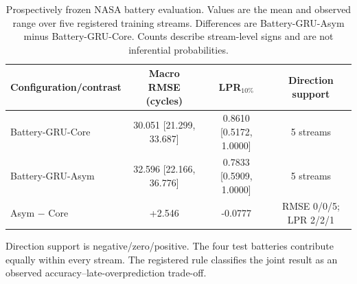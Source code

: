\begin{table}[H]
\centering
\small
\caption{Prospectively frozen NASA battery evaluation. Values are the mean and observed range over five registered training streams. Differences are Battery-GRU-Asym minus Battery-GRU-Core. Counts describe stream-level signs and are not inferential probabilities.}
\label{tab:battery-primary}
\begin{tabular}{@{}lccc@{}}
\toprule
Configuration/contrast & Macro RMSE (cycles) & LPR$_{10\%}$ & Direction support \\
\midrule
Battery-GRU-Core & 30.051 [21.299, 33.687] & 0.8610 [0.5172, 1.0000] & 5 streams \\
Battery-GRU-Asym & 32.596 [22.166, 36.776] & 0.7833 [0.5909, 1.0000] & 5 streams \\
\midrule
Asym $-$ Core & +2.546 & -0.0777 & RMSE 0/0/5; LPR 2/2/1 \\
\bottomrule
\end{tabular}
\begin{minipage}{0.96\linewidth}\footnotesize Direction support is negative/zero/positive. The four test batteries contribute equally within every stream. The registered rule classifies the joint result as an observed accuracy--late-overprediction trade-off.\end{minipage}
\end{table}
